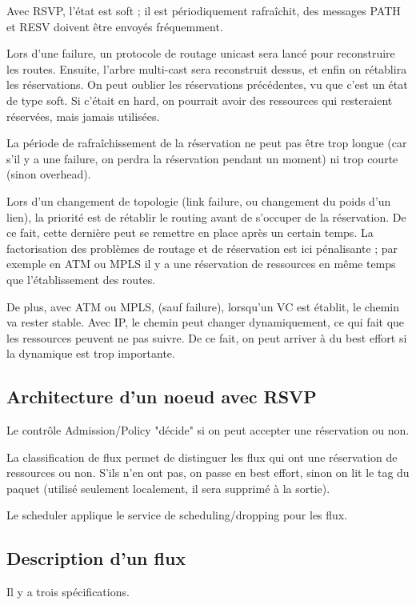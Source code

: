 			Avec RSVP, l'état est soft ; il est périodiquement rafraîchit, des messages PATH et RESV doivent être envoyés fréquemment.
			
			Lors d'une failure, un protocole de routage unicast sera lancé pour reconstruire les routes. Ensuite, l'arbre multi-cast sera reconstruit dessus, et enfin on rétablira les réservations. On peut oublier les réservations précédentes, vu que c'est un état de type soft. Si c'était en hard, on pourrait avoir des ressources qui resteraient réservées, mais jamais utilisées.
		
			La période de rafraîchissement de la réservation ne peut pas être trop longue (car s'il y a une failure, on perdra la réservation pendant un moment) ni trop courte (sinon overhead).
		
			Lors d'un changement de topologie (link failure, ou changement du poids d'un lien), la priorité est de rétablir le routing avant de s'occuper de la réservation. De ce fait, cette dernière peut se remettre en place après un certain temps. La factorisation des problèmes de routage et de réservation est ici pénalisante ; par exemple en ATM ou MPLS il y a une réservation de ressources en même temps que l'établissement des routes. 
		
			De plus, avec ATM ou MPLS, (sauf failure), lorsqu'un VC est établit, le chemin va rester stable. Avec IP, le chemin peut changer dynamiquement, ce qui fait que les ressources peuvent ne pas suivre. De ce fait, on peut arriver à du best effort si la dynamique est trop importante.
		
			\subsection{Architecture d'un noeud avec RSVP}
			
			
			Le contrôle Admission/Policy "décide" si on peut accepter une réservation ou non.
			
			La classification de flux permet de distinguer les flux qui ont une réservation de ressources ou non. S'ils n'en ont pas, on passe en best effort, sinon on lit le tag du paquet (utilisé seulement localement, il sera supprimé à la sortie).
			
			Le scheduler applique le service de scheduling/dropping pour les flux.
			
			\subsection{Description d'un flux}
			Il y a trois spécifications.
		
